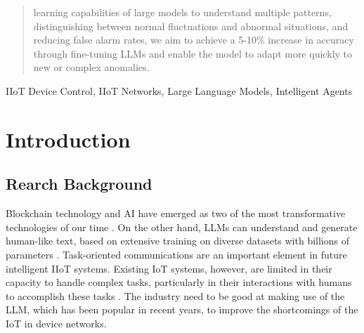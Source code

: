 \documentclass[usenatbib]{tjaa}
\begin{document}
\begin{abstract}
learning capabilities of large models to understand multiple patterns, distinguishing between normal fluctuations and abnormal situations,
and reducing false alarm rates, we aim to achieve a 5-10\% increase in accuracy through fine-tuning LLMs and enable
the model to adapt more quickly to new or complex anomalies.
\end{abstract}
%
\begin{keywords}
IIoT Device Control, IIoT Networks, Large Language Models, Intelligent Agents
\end{keywords}

\section{Introduction}
\label{sec:intro}

\subsection{Rearch Background}

Blockchain technology and AI have
emerged as two of the most transformative technologies of our
time \citep{zuo2024federated}.
On the other hand,
LLMs can understand and generate
human-like text, based on extensive training on diverse datasets
with billions of parameters \citep{kalita2024large}.
Task-oriented communications are an important
element in future intelligent IIoT systems. Existing IoT systems,
however, are limited in their capacity to handle complex tasks,
particularly in their interactions with humans to accomplish these
tasks \citep{cui2024llmind}. 
The industry need to be good at making use of the LLM,
which has been popular in recent years, to improve
the shortcomings of the IoT in device networks.
\end{document}
